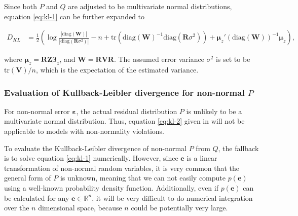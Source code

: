 \documentclass[]{interact}
\theoremstyle{plain}%
\theoremstyle{definition}
\theoremstyle{remark}
\begin{document}
Since both \(P\) and \(Q\) are adjusted to be multivariate normal
distributions, equation \ref{eq:kl-1} can be further expanded to

\begin{align}
\label{eq:kl-2}
D_{KL} &= \frac{1}{2}\left(\log\frac{|\text{diag}(\boldsymbol{W})|}{|\text{diag}(\boldsymbol{R}\sigma^2)|} - n + \text{tr}(\text{diag}(\boldsymbol{W})^{-1}\text{diag}(\boldsymbol{R}\sigma^2)) + \boldsymbol{\mu}_z'(\text{diag}(\boldsymbol{W}))^{-1}\boldsymbol{\mu}_z\right),
\end{align}

\noindent where
\(\boldsymbol{\mu}_z = \boldsymbol{R}\boldsymbol{Z}\boldsymbol{\beta}_z\),
and \(\boldsymbol{W} = \boldsymbol{R}\boldsymbol{V}\boldsymbol{R}\). The
assumed error variance \(\sigma^2\) is set to be
\(\text{tr}(\boldsymbol{V})/n\), which is the expectation of the
estimated variance.

\hypertarget{evaluation-of-kullback-leibler-divergence-for-non-normal-p}{%
\subsubsection{\texorpdfstring{Evaluation of Kullback-Leibler divergence
for non-normal
\(P\)}{Evaluation of Kullback-Leibler divergence for non-normal P}}\label{evaluation-of-kullback-leibler-divergence-for-non-normal-p}}

For non-normal error \(\boldsymbol{\varepsilon}\), the actual residual
distribution \(P\) is unlikely to be a multivariate normal distribution.
Thus, equation \ref{eq:kl-2} given in \citet{li2023plot} will not be
applicable to models with non-normality violations.

To evaluate the Kullback-Leibler divergence of non-normal \(P\) from
\(Q\), the fallback is to solve equation \ref{eq:kl-1} numerically.
However, since \(\boldsymbol{e}\) is a linear transformation of
non-normal random variables, it is very common that the general form of
\(P\) is unknown, meaning that we can not easily compute
\(p(\boldsymbol{e})\) using a well-known probability density function.
Additionally, even if \(p(\boldsymbol{e})\) can be calculated for any
\(\boldsymbol{e} \in \mathbb{R}^n\), it will be very difficult to do
numerical integration over the \(n\) dimensional space, because \(n\)
could be potentially very large.
\end{document}
